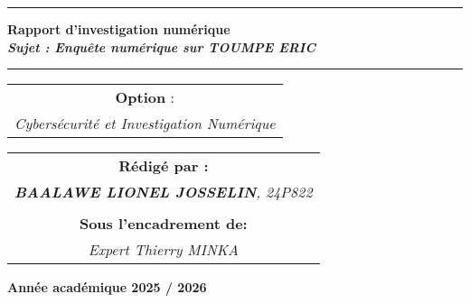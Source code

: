 \documentclass[memoire, 12pt]{report}
\begin{document}
\begin{titlepage}
\begin{center}
		\vspace{0.5cm}
		\begin{tabular}{l*{40}{@{\hskip 3.5cm}c@{\hskip5cm}} p{3.5cm} r}
		\end{tabular}
		
		\noindent\rule{\textwidth}{0.7mm}
		\Large{{\textbf{Rapport d’investigation numérique}}}\\
		\Large{{\textbf{\textit{Sujet : Enquête numérique sur TOUMPE ERIC}}}}
		\noindent\rule{\textwidth}{0.7mm}
	\end{center}
		
	\begin{center}
	\begin{tabular}{c}
		
		\vspace{0.1cm}
		\normalsize
	
	
		\vspace{1cm}
		\normalsize\textbf{Option }:\\
		\normalsize				
		\textsl{Cybersécurité et Investigation Numérique}
		
	\end{tabular}
	\end{center}
		
	\begin{center}
		\normalsize %
		\begin{tabular}{c}
			\vspace{0.07cm}
			\hspace{0.02cm} \textbf{\textbf{Rédigé par :}}\\
			\hspace{0.02cm} \textsl{\textbf{BAALAWE LIONEL JOSSELIN}, 24P822}\\\\
			\vspace{0.1cm}
			\hspace{0.02cm} \textbf{Sous l'encadrement de:}\\
			\hspace{0.02cm} \textsl{Expert Thierry MINKA}\\
				
               
		\end{tabular}
	\end{center}
    
	\vspace{1,2cm}
	\begin{center}
		\textbf{Année académique 2025 / 2026}
	\end{center}
		
	\vspace{-1.4cm}
	
		
	\vfill%

\end{titlepage}
\end{document}
